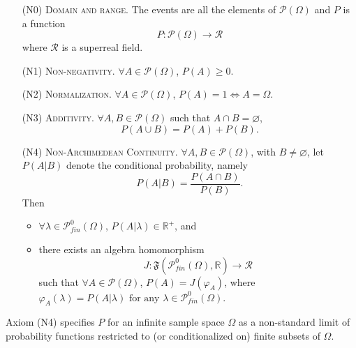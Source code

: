 \begin{itemize}
\item[(N0)] \textsc{Domain and range.} The events are all the elements of $\mathcal{P}\left( \Omega \right)$ and $P$ is a function
$$
P:\mathcal{P}\left( \Omega \right) \rightarrow \mathcal{R}
$$
where $\mathcal{R}$ is a superreal field.
\item[(N1)] \textsc{Non-negativity.} $\forall A\in \mathcal{P}\left( \Omega \right)$, $P(A)\geq 0$.
\item[(N2)] \textsc{Normalization.} $\forall A\in \mathcal{P}\left( \Omega \right)$, $P(A)=1\Leftrightarrow A=\Omega.$
\item[(N3)] \textsc{Additivity.} $\forall A, B\in \mathcal{P}\left( \Omega \right)$ such that $A\cap B=\varnothing$, $$P(A\cup B)=P(A)+P(B).$$
\item[(N4)] \textsc{Non-Archimedean Continuity.} $\forall A, B\in \mathcal{P}\left( \Omega \right)$, with $B\neq \varnothing$, let $P(A|B)$ denote the conditional probability, namely
\begin{equation*}
P(A|B)=\frac{P(A\cap B)}{P(B)}.
\end{equation*}
Then
  \begin{itemize}
  \item $\forall \lambda \in \mathcal{P}_{fin}^0(\Omega)$, $P(A|\lambda )\in \mathbb{R^+}$, and
  \item there exists an algebra homomorphism
  $$ J:\mathfrak{F}\left( \mathcal{P}_{fin}^0(\Omega ),\mathbb{R}\right) \rightarrow \mathcal{R} $$
  such that $\forall A\in \mathcal{P}(\Omega )$, $ P(A)=J\left( \varphi _{A}\right)$,
  where $ \varphi _{A}(\lambda )=P(A|\lambda ) \textrm{ for any } \lambda \in \mathcal{P}_{fin}^0(\Omega)$.
  \end{itemize}
\end{itemize}
Axiom (N4) specifies $P$ for an infinite sample space $\Omega$ as a non-standard limit of probability functions restricted to (or conditionalized on) finite subsets of $\Omega$.

